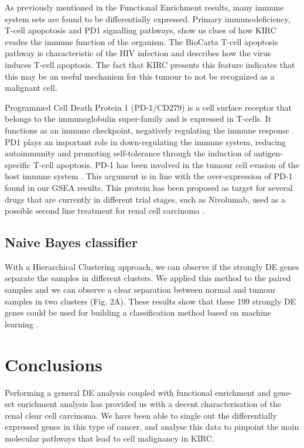 \documentclass[9pt,twocolumn,twoside]{gsajnl}
\begin{document}
As previously mentioned in the Functional Enrichment results, many immune system sets are found to be differentially expressed. Primary immunodeficiency, T-cell apopotosis and PD1 signalling pathways, show us clues of how KIRC evades the immune function of the organism. The BioCarta T-cell apoptosis pathway is characteristic of the HIV infection and describes how the virus induces T-cell apoptosis. The fact that KIRC presents this feature indicates that this may be an useful mechanism for this tumour to not be recognized as a malignant cell.

Programmed Cell Death Protein 1 (PD-1/CD279) is a cell surface receptor that belongs to the immunoglobulin super-family and is expressed in T-cells. It functions as an immune checkpoint, negatively regulating the immune response \citep{Francisco2010}. PD1 plays an important role in down-regulating the immune system, reducing autoimmunity and promoting self-tolerance through the induction of antigen-specific T-cell apoptosis.
PD-1 has been involved in the tumour cell evasion of the host immune system \citep{Iwai2002}. This argument is in line with the over-expression of PD-1 found in our GSEA results. This protein has been proposed as target for several drugs that are currently in different trial stages, such as Nivolumab, used as a possible second line treatment for renal cell carcinoma \citep{nivolumab}.


\subsection*{Naive Bayes classifier}
With a Hierarchical Clustering approach, we can observe if the strongly DE genes separate the samples in different clusters. We applied this method to the paired samples and we can observe a clear separation between normal and tumour samples in two clusters (Fig. 2A). These results show that these 199 strongly DE genes could be used for building a classification method based on machine learning \citep{Yang2014}. 

\section*{Conclusions}

Performing a general DE analysis coupled with functional enrichment and gene-set enrichment analysis has provided us with a decent characterisation of the renal clear cell carcinoma. We have been able to single out the differentially expressed genes in this type of cancer, and analyse this data to pinpoint the main molecular pathways that lead to cell malignancy in KIRC. 
\end{document}
